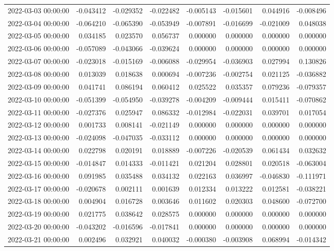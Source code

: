 \begin{tabular}{lrrrrrrr}
2022-03-03 00:00:00 & -0.043412 & -0.029352 & -0.022482 & -0.005143 & -0.015601 & 0.044916 & -0.008496 \\
2022-03-04 00:00:00 & -0.064210 & -0.065390 & -0.053949 & -0.007891 & -0.016699 & -0.021009 & 0.048038 \\
2022-03-05 00:00:00 & 0.034185 & 0.023570 & 0.056737 & 0.000000 & 0.000000 & 0.000000 & 0.000000 \\
2022-03-06 00:00:00 & -0.057089 & -0.043066 & -0.039624 & 0.000000 & 0.000000 & 0.000000 & 0.000000 \\
2022-03-07 00:00:00 & -0.023018 & -0.015169 & -0.006088 & -0.029954 & -0.036903 & 0.027994 & 0.130826 \\
2022-03-08 00:00:00 & 0.013039 & 0.018638 & 0.000694 & -0.007236 & -0.002754 & 0.021125 & -0.036882 \\
2022-03-09 00:00:00 & 0.041741 & 0.086194 & 0.060412 & 0.025522 & 0.035357 & 0.079236 & -0.079357 \\
2022-03-10 00:00:00 & -0.051399 & -0.054950 & -0.039278 & -0.004209 & -0.009444 & 0.015411 & -0.070862 \\
2022-03-11 00:00:00 & -0.027376 & 0.025947 & 0.086332 & -0.012984 & -0.022031 & 0.039701 & 0.017054 \\
2022-03-12 00:00:00 & 0.001733 & 0.008141 & -0.021149 & 0.000000 & 0.000000 & 0.000000 & 0.000000 \\
2022-03-13 00:00:00 & -0.024098 & -0.047035 & -0.033112 & 0.000000 & 0.000000 & 0.000000 & 0.000000 \\
2022-03-14 00:00:00 & 0.022798 & 0.020191 & 0.018889 & -0.007226 & -0.020539 & 0.061434 & 0.032632 \\
2022-03-15 00:00:00 & -0.014847 & 0.014333 & -0.011421 & 0.021204 & 0.028801 & 0.020518 & -0.063004 \\
2022-03-16 00:00:00 & 0.091985 & 0.035488 & 0.034132 & 0.022163 & 0.036997 & -0.046830 & -0.111971 \\
2022-03-17 00:00:00 & -0.020678 & 0.002111 & 0.001639 & 0.012334 & 0.013222 & 0.012581 & -0.038221 \\
2022-03-18 00:00:00 & 0.004904 & 0.016728 & 0.003646 & 0.011602 & 0.020303 & 0.048600 & -0.072700 \\
2022-03-19 00:00:00 & 0.021775 & 0.038642 & 0.028575 & 0.000000 & 0.000000 & 0.000000 & 0.000000 \\
2022-03-20 00:00:00 & -0.043202 & -0.016596 & -0.017841 & 0.000000 & 0.000000 & 0.000000 & 0.000000 \\
2022-03-21 00:00:00 & 0.002496 & 0.032921 & 0.040032 & -0.000380 & -0.003908 & 0.068994 & -0.014342 \\

\end{tabular}
